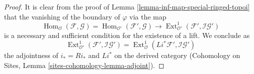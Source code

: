 \documentclass[10pt,a4paper]{amsart}
\theoremstyle{plain}
\theoremstyle{definition}
\theoremstyle{remark}
\numberwithin{equation}{subsection}
\def\Hom{\mathop{\mathrm{Hom}}\nolimits}
\def\Ext{\mathop{\mathrm{Ext}}\nolimits}
\begin{document}
\begin{proof}
It is clear from the proof of Lemma \ref{lemma-inf-map-special-ringed-topoi}
that the vanishing of the boundary of $\varphi$ via the map
$$
\Hom_\mathcal{O}(\mathcal{F}, \mathcal{G}) =
\Hom_{\mathcal{O}'}(\mathcal{F}', \mathcal{G}) \longrightarrow
\Ext^1_{\mathcal{O}'}(\mathcal{F}', \mathcal{I}\mathcal{G}')
$$
is a necessary and sufficient condition for the existence of a lift. We
conclude as
$$
\Ext^1_{\mathcal{O}'}(\mathcal{F}', \mathcal{I}\mathcal{G}') =
\Ext^1_\mathcal{O}(Li^*\mathcal{F}', \mathcal{I}\mathcal{G}')
$$
the adjointness of $i_* = Ri_*$ and $Li^*$ on the derived category
(Cohomology on Sites, Lemma \ref{sites-cohomology-lemma-adjoint}).
\end{proof}
\end{document}

